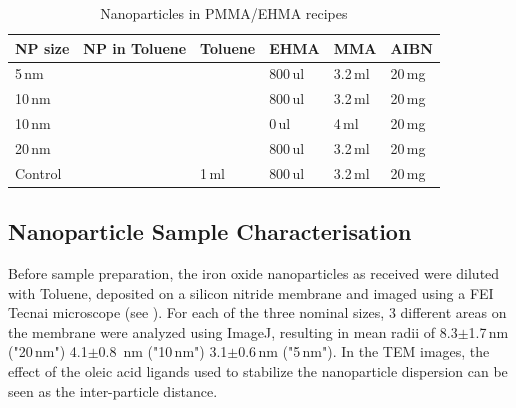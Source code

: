 \begin{table}[tp]
	\centering
	\caption{Nanoparticles in PMMA/EHMA recipes}
	\label{tab:sampleCP}
	\begin{tabular}{llllll}
		\hline
		NP size &NP in Toluene&Toluene & EHMA & MMA & AIBN \\
		\hline
		5\,nm& & &800\,ul&  3.2\,ml&   20\,mg    \\
		10\,nm& & &800\,ul&  3.2\,ml&   20\,mg    \\
		10\,nm& & &0\,ul&  4\,ml&   20\,mg    \\
		20\,nm& & &800\,ul&  3.2\,ml&   20\,mg    \\
			Control& & 1\,ml&800\,ul&  3.2\,ml&   20\,mg    \\
		\hline
	\end{tabular}
\end{table}

\subsection{Nanoparticle Sample Characterisation}
Before sample preparation, the iron oxide nanoparticles as received were diluted with Toluene, deposited on a silicon nitride membrane and imaged using a FEI Tecnai microscope  (see ).  For each of the three nominal sizes, 3 different areas on the membrane were analyzed using ImageJ, resulting in mean radii of 8.3$\pm$1.7\,nm ("20\,nm") 4.1$\pm$0.8 \,nm	("10\,nm") 3.1$\pm$0.6\,nm ("5\,nm"). In the TEM images, the effect of the oleic acid ligands used to stabilize the nanoparticle dispersion  can be seen as the inter-particle distance.

